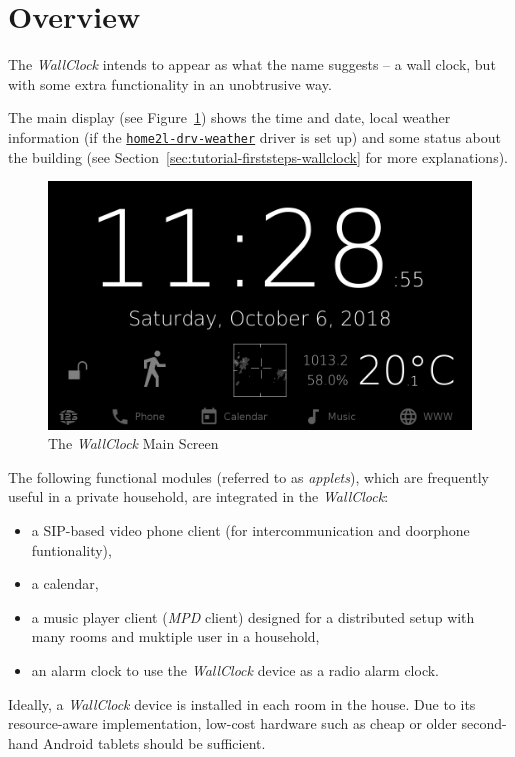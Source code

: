 \documentclass[12pt,english,parskip=half]{scrreprt}
\newcommand{\idx}[1]{#1\index{#1}}
\newcommand{\toolref}[1]{\hyperref[tool:#1]{\texttt{\idx{#1}}}}
\begin{document}
\section{Overview}
\label{sec:wallclock-overview}


The \emph{WallClock} intends to appear as what the name suggests -- a
wall clock, but with some extra functionality in an unobtrusive way.

The main display (see Figure~\ref{fig:screen-wallclock-home})
shows the time and date, local weather information (if the \toolref{home2l-drv-weather} driver is set
up) and some status about the building (see Section~\ref{sec:tutorial-firststeps-wallclock} for more
explanations).


\begin{figure}[ht]
  \centering
  \includegraphics[width=0.7\linewidth]{figs/screen-wallclock-home.png}
  \caption[l]{The \emph{WallClock} Main Screen}
  \label{fig:screen-wallclock-home}
\end{figure}


The following functional modules
(referred to as \emph{applets}), which are frequently useful in a
private household, are integrated in the \emph{WallClock}:

\begin{itemize}
\item
  a SIP-based video phone client (for intercommunication and doorphone funtionality),
\item
  a calendar,
\item
  a music player client (\emph{MPD} client) designed for a distributed
  setup with many rooms and muktiple user in a household,
\item
  an alarm clock to use the \emph{WallClock} device as a radio alarm clock.
\end{itemize}

Ideally, a \emph{WallClock} device is installed in each room in the
house. Due to its resource-aware implementation, low-cost hardware
such as cheap or older second-hand Android tablets should be sufficient.
\end{document}
